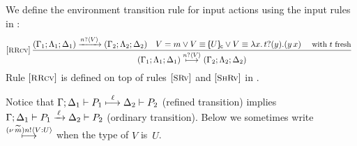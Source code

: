 \documentclass[a4paper,UKenglish]{lipics}
\theoremstyle{definition}
\begin{document}
\begin{definition}
	\label{def:rlts}
	We define the environment transition rule for input actions 
	using the input rules in :
	\[ \!\!\!
	\begin{array}{l}
			
						\eltsrule{RRcv}\,\tree {
	(\Gamma_1; \Lambda_1; \Delta_1) \by{\bactinp{n}{V}} (\Gamma_2; \Lambda_2; \Delta_2)
	\quad
					V = m 
					\vee  V \scong \omapchar{U}%
										\vee V  \scong \abs{{x}}{\binp{t}{y} (\appl{y}{{x}})}
					\text{ {\small with $t$ fresh}} 
			}{
				(\Gamma_1; \Lambda_1; \Delta_1) \hby{\bactinp{n}{V}} (\Gamma_2; \Lambda_2; \Delta_2)
			}
			
			
	\end{array}
	\]
	\noi Rule $\eltsrule{RRcv}$ is defined on top
	of rules $\eltsrule{SRv}$ and $\eltsrule{ShRv}$
	in .
\end{definition}

\noi Notice that
$\Gamma; \Delta_1 \vdash P_1 \stackrel{\ell}{\longmapsto} \Delta_2 \vdash P_2$ (refined transition) implies  
$\Gamma; \Delta_1 \vdash P_1 \xrightarrow{\,\ell\,} \Delta_2 \vdash P_2$ (ordinary transition).
Below we sometimes write  
$\stackrel{(\nu\, \widetilde{m}) n ! \langle V : U \rangle}{\longmapsto}$
when the type of $V$ is~$U$.
\end{document}
